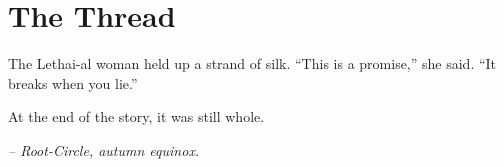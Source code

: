 \chapter*{The Thread}

The Lethai-al woman held up a strand of silk. ``This is a promise,'' she said. ``It breaks when you lie.''

At the end of the story, it was still whole.

\smallskip

\noindent \textit{-- Root-Circle, autumn equinox.}


